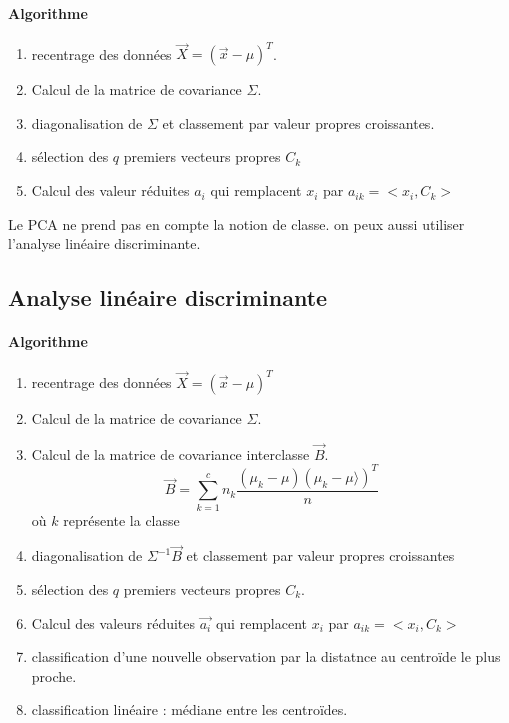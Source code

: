\documentclass[main.tex]{subfiles}
\begin{document}
\paragraph{Algorithme}

\begin{enumerate}
\item recentrage des données $\vec{X} = (\vec{x}-\mu)^T$.
\item Calcul de la matrice de covariance $\Sigma$.
\item diagonalisation de $\Sigma$ et classement par valeur propres croissantes.
\item sélection des $q$ premiers vecteurs propres $C_k$
\item Calcul des valeur réduites $a_i$ qui remplacent $x_i$ par $a_{ik}= <x_i,C_k>$
\end{enumerate}

\begin{rem}
  Le PCA ne prend pas en compte la notion de classe. on peux aussi utiliser l'analyse linéaire discriminante.
\end{rem}
\subsection{Analyse linéaire discriminante}

\paragraph{Algorithme}
\begin{enumerate}
\item recentrage des données $\vec{X}=(\vec{x}-\mu)^T$
\item Calcul de la matrice de covariance $\Sigma$.
\item Calcul de la matrice de covariance interclasse $\vec{B}$.
  \[
    \vec{B} = \sum_{k=1}^{c}n_k\frac{(\mu_k-\mu)(\mu_k-\mu\rangle)^T}{n}
  \]
  où $k$ représente la classe
\item diagonalisation de $\Sigma^{-1}\vec{B}$ et classement par valeur propres croissantes
\item sélection des $q$ premiers vecteurs propres $C_k$.
\item Calcul des valeurs réduites $\vec{a_i}$ qui remplacent $x_i$ par $a_{ik}=<x_i,C_k>$
\item classification d'une nouvelle observation par la distatnce au centroïde le plus proche.
\item classification linéaire : médiane entre les centroïdes.
\end{enumerate}
\end{document}
